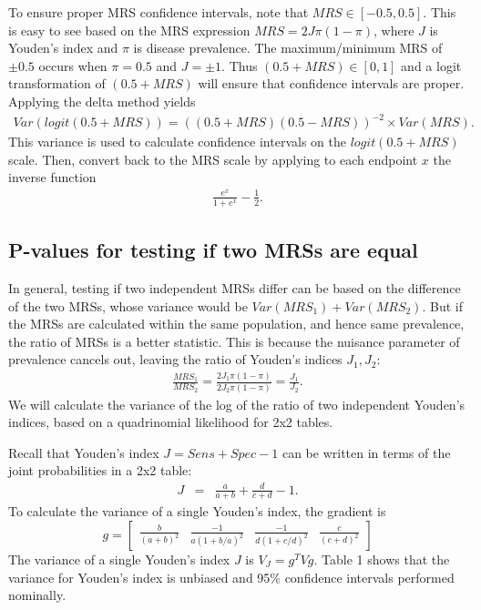 \documentclass[AMA,STIX1COL]{WileyNJD-v2}
\begin{document}
To ensure proper MRS confidence intervals, note that $MRS\in [-0.5,0.5]$.  This is easy to see based on the MRS expression $MRS=2J\pi(1-\pi)$, where $J$ is Youden's index and $\pi$ is disease prevalence.  The maximum/minimum MRS of $\pm0.5$ occurs when $\pi=0.5$ and $J=\pm1$.  Thus $(0.5+MRS)\in [0,1]$ and a logit transformation of $(0.5+MRS)$ will ensure that confidence intervals are proper.  Applying the delta method yields
\begin{eqnarray*}
	Var(logit(0.5+MRS)) = ( (0.5+MRS)(0.5-MRS) )^{-2} \times Var(MRS).
\end{eqnarray*}
This variance is used to calculate confidence intervals on the $logit(0.5+MRS)$ scale.  Then, convert back to the MRS scale by applying to each endpoint $x$ the inverse function
\begin{eqnarray*}
	\frac{e^x}{1+e^x} - \frac{1}{2}.
\end{eqnarray*}



\subsection{P-values for testing if two MRSs are equal}

In general, testing if two independent MRSs differ can be based on the difference of the two MRSs, whose variance would be $Var(MRS_1)+Var(MRS_2)$.  But if the MRSs are calculated within the same population, and hence same prevalence, the ratio of MRSs is a better statistic.  This is because the nuisance parameter of prevalence cancels out, leaving the ratio of Youden's indices $J_1,J_2$:
\begin{eqnarray*}
	\frac{MRS_1}{MRS_2} = \frac{2J_1\pi(1-\pi)}{2J_2\pi(1-\pi)} = \frac{J_1}{J_2}.
\end{eqnarray*}
We will calculate the variance of the log of the ratio of two independent Youden's indices, based on a quadrinomial likelihood for 2x2 tables.  

Recall that Youden's index $J=Sens+Spec-1$ can be written in terms of the joint probabilities in a 2x2 table:
\begin{eqnarray*}
	J &=& \frac{a}{a+b} + \frac{d}{c+d} - 1.
\end{eqnarray*}
To calculate the variance of a single Youden's index, the gradient is
\[
g=
\begin{bmatrix}
\frac{b}{(a+b)^2} & \frac{-1}{a(1+b/a)^2} & \frac{-1}{d(1+c/d)^2} & \frac{c}{(c+d)^2} 
\end{bmatrix}
\]
The variance of a single Youden's index $J$ is $V_J=g^TVg$.  Table 1 shows that the variance for Youden's index is unbiased and 95\% confidence intervals performed nominally.
\end{document}
